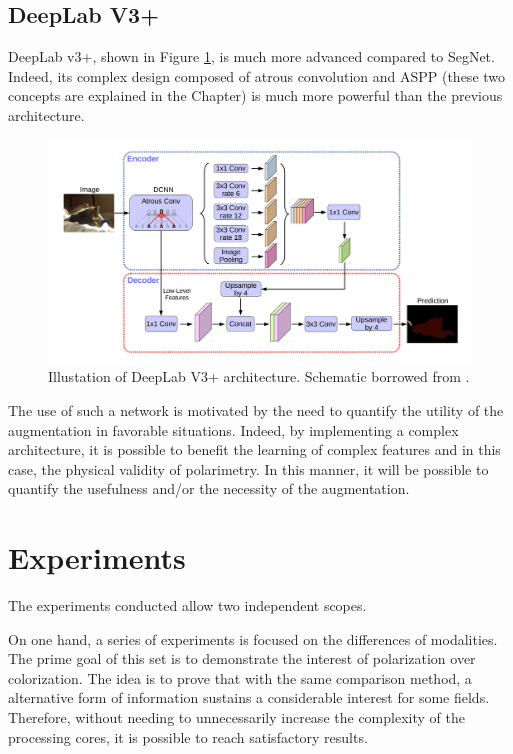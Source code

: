 \subsection{DeepLab V3+}\label{deeplab_sec}

DeepLab v3+\cite{chen2017rethinking}, shown in Figure \ref{deeplab-fig}, is much more advanced compared to SegNet. Indeed, its complex design composed of atrous convolution and ASPP (these two concepts are explained in the Chapter) is much more powerful than the previous architecture. 
\begin{figure}[h]
	\centering
	\includegraphics[width=\linewidth]{Figures/DL/deeplab-arch.png}
	\caption[Illustation of DeepLab V3+ architecture.]{Illustation of DeepLab V3+ architecture. Schematic borrowed from \cite{chen2017rethinking}.}\label{deeplab-fig}
\end{figure}


The use of such a network is motivated by the need to quantify the utility of the augmentation in favorable situations. Indeed, by implementing a complex architecture, it is possible to benefit the learning of complex features and in this case, the physical validity of polarimetry. 
In this manner, it will be possible to quantify the usefulness and/or the necessity of the augmentation.



\section{Experiments}\label{exp_4}

The experiments conducted allow two independent scopes.


On one hand, a series of experiments is focused on the differences of modalities. The prime goal of this set is to demonstrate the interest of polarization over colorization. The idea is to prove that with the same comparison method, a alternative form of information sustains a considerable interest for some fields. Therefore, without needing to unnecessarily increase the complexity of the processing cores, it is possible to reach satisfactory results.


